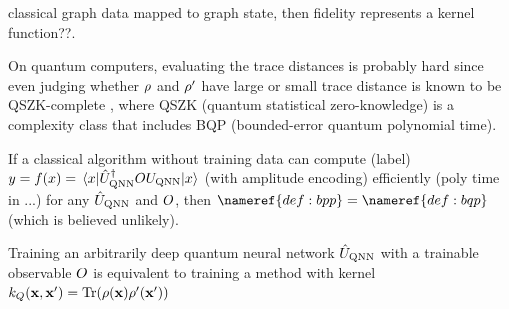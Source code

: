 classical graph data mapped to graph state, then fidelity represents a kernel function??.
\begin{theorem}
	On quantum computers, evaluating the trace distances is probably hard since even judging whether $\rho$ and $\rho'$ have large or small trace distance is known to be QSZK-complete \cite{watrousQuantumComputationalComplexity2008}, where QSZK (quantum statistical zero-knowledge) is a complexity class that includes BQP (bounded-error quantum polynomial time).
\cite{chenVariationalQuantumAlgorithms2022}
\end{theorem}
\begin{proposition}
	If a classical algorithm without training data can compute (label) $y=f(x)=\mel{x}{\hat{U}_{\textup{QNN}}^\dagger OU_{\textup{QNN}}}{x}$ (with amplitude encoding) efficiently (poly time in ...) for any $\hat{U}_{\textup{QNN}}$ and $O$, then $\nameref{def:bpp}=\nameref{def:bqp}$ (which is believed unlikely).
\end{proposition}
\begin{proposition}
	Training an arbitrarily deep quantum neural network $\hat{U}_{\textup{QNN}}$ with a trainable observable $O$ is equivalent to training a  method with kernel $k_{Q}(\vb{x},\vb{x}')=\Tr(\rho(\vb{x})\rho'(\vb{x}'))$
\end{proposition}

